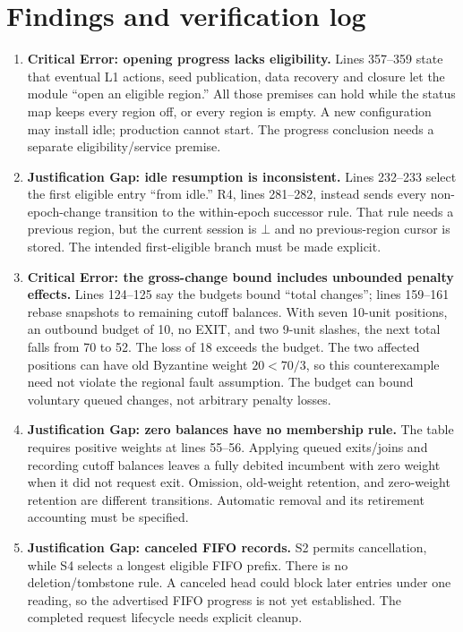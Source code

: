 \documentclass[11pt,a4paper]{article}
\begin{document}
\section*{Findings and verification log}
\begin{enumerate}[label=\textbf{V1-\arabic*.},leftmargin=*,itemsep=9pt]
\item \textbf{Critical Error: opening progress lacks eligibility.}
Lines 357--359 state that eventual L1 actions, seed publication, data
recovery and closure let the module ``open an eligible region.'' All those
premises can hold while the status map keeps every region off, or every
region is empty. A new configuration may install idle; production cannot
start. The progress conclusion needs a separate eligibility/service premise.

\item \textbf{Justification Gap: idle resumption is inconsistent.}
Lines 232--233 select the first eligible entry ``from idle.'' R4,
lines 281--282, instead sends every non-epoch-change transition to the
within-epoch successor rule. That rule needs a previous region, but
the current session is $\bot$ and no previous-region cursor is stored.
The intended first-eligible branch must be made explicit.

\item \textbf{Critical Error: the gross-change bound includes unbounded
penalty effects.}
Lines 124--125 say the budgets bound ``total changes''; lines 159--161
rebase snapshots to remaining cutoff balances. With seven 10-unit
positions, an outbound budget of 10, no EXIT, and two 9-unit slashes,
the next total falls from 70 to 52. The loss of 18 exceeds the budget.
The two affected positions can have old Byzantine weight $20<70/3$,
so this counterexample need not violate the regional fault assumption.
The budget can bound voluntary queued changes, not arbitrary penalty losses.

\item \textbf{Justification Gap: zero balances have no membership rule.}
The table requires positive weights at lines 55--56. Applying queued
exits/joins and recording cutoff balances leaves a fully debited incumbent
with zero weight when it did not request exit. Omission, old-weight
retention, and zero-weight retention are different transitions. Automatic
removal and its retirement accounting must be specified.

\item \textbf{Justification Gap: canceled FIFO records.}
S2 permits cancellation, while S4 selects a longest eligible FIFO prefix.
There is no deletion/tombstone rule. A canceled head could block later
entries under one reading, so the advertised FIFO progress is not yet
established. The completed request lifecycle needs explicit cleanup.


\end{enumerate}
\end{document}
